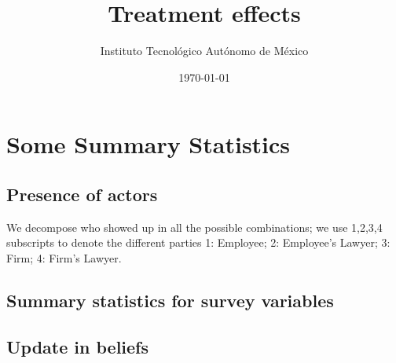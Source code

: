 \documentclass[12pt]{article}
\theoremstyle{named}
\newcommand{\folder}{./Effect}
\begin{document}
\title{Treatment effects}

\author{Instituto Tecnológico Autónomo de México}
\date{\today}
\maketitle


\hrulefill


\section{\Huge{Some Summary Statistics}}

\vspace{7mm}

\subsection*{Presence of actors}


\begin{center}
\scriptsize{}
\end{center}

We decompose who showed up in all the possible combinations; we use 1,2,3,4 subscripts to denote the different parties 1: Employee; 2: Employee’s Lawyer;  3: Firm; 4: Firm’s Lawyer. 


\begin{center}
\scriptsize{}
\end{center}

\pagebreak

\subsection*{Summary statistics for survey variables}

\begin{center}
\scriptsize{}
\end{center}


\begin{center}
\scriptsize{}
\end{center}


\begin{center}
\scriptsize{}
\end{center}


\pagebreak

\subsection*{Update in beliefs}
\end{document}
